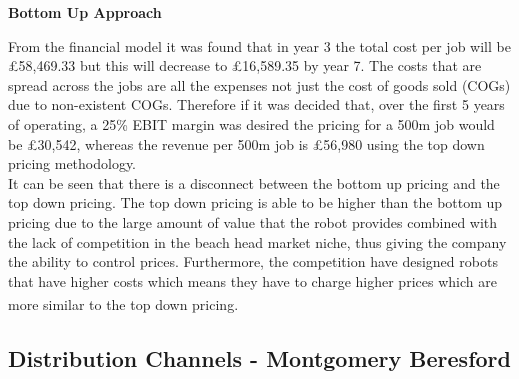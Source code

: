 \documentclass[11pt]{article}		%
\newcommand{\supercite}[1]{\textsuperscript{\cite{#1}}}		%
\begin{document}
                        \textbf{Bottom Up Approach}
            
            	            From the financial model it was found that in year 3 the total cost per job will be £58,469.33 but this will decrease to £16,589.35 by year 7. The costs that are spread across the jobs are all the expenses not just the cost of goods sold (COGs) due to non-existent COGs. Therefore if it was decided that, over the first 5 years of operating, a 25\% EBIT margin was desired the pricing for a 500m job would be £30,542, whereas the revenue per 500m job is £56,980 using the top down pricing methodology.
            	            \\
            	            It can be seen that there is a disconnect between the bottom up pricing and the top down pricing. The top down pricing is able to be higher than the bottom up pricing due to the large amount of value that the robot provides combined with the lack of competition in the beach head market niche, thus giving the company the ability to control prices. Furthermore, the competition have designed robots that have higher costs which means they have to charge higher prices which are more similar to the top down pricing.\supercite{Barney}
        
        \subsection[Distribution Channels]{Distribution Channels - Montgomery Beresford}
	        
\end{document}

